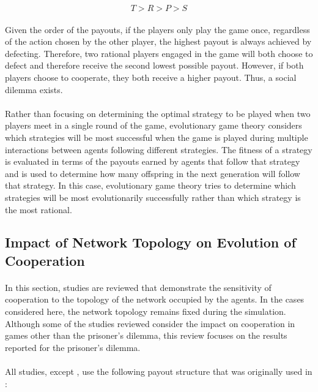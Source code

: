 \documentclass{article}
\begin{document}
    \begin{equation}
    	T > R > P > S
    \end{equation}
    
    \paragraph{}Given the order of the payouts, if the players only play the game once, regardless of the action chosen by the other player, the highest payout is always achieved by defecting.  Therefore, two rational players engaged in the game will both choose to defect and therefore receive the second lowest possible payout.  However, if both players choose to cooperate, they both receive a higher payout.  Thus, a social dilemma exists.
    \paragraph{}Rather than focusing on determining the optimal strategy to be played when two players meet in a single round of the game, evolutionary game theory considers which strategies will be most successful when the game is played during multiple interactions between agents following different strategies.  The fitness of a strategy is evaluated in terms of the payouts earned by agents that follow that strategy and is used to determine how many offspring in the next generation will follow that strategy.  In this case, evolutionary game theory tries to determine which strategies will be most evolutionarily successfully rather than which strategy is the most rational.

    \subsection{Impact of Network Topology on Evolution of Cooperation}
    \paragraph{}In this section, studies are reviewed that demonstrate the sensitivity of cooperation to the topology of the network occupied by the agents.  In the cases considered here, the network topology remains fixed during the simulation.  Although some of the studies reviewed consider the impact on cooperation in games other than the prisoner’s dilemma, this review focuses on the results reported for the prisoner’s dilemma.
    \paragraph{}All studies, except \cite{Santos2006c}, use the following payout structure that was originally used in \cite{Nowak1992}:
\end{document}
